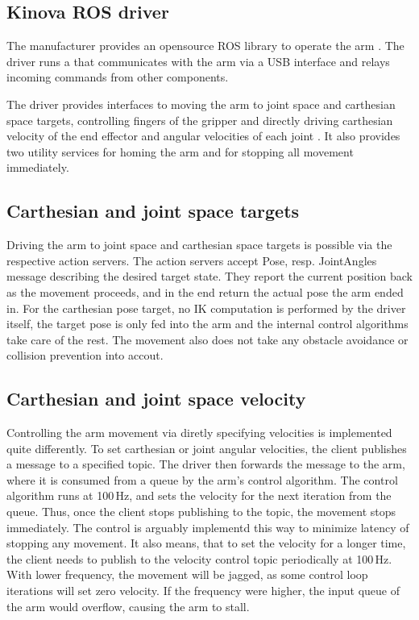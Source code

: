 \documentclass[buriama8_dp.tex]{subfiles}
\begin{document}
\subsection{Kinova ROS driver}
\label{subsec:kinova_ros}

The manufacturer provides an opensource ROS library to operate the arm \cite{kinova_ros}. The driver runs a  that communicates with the arm via a USB interface and relays incoming commands from other components.

The driver provides interfaces to moving the arm to joint space and carthesian space targets, controlling fingers of the gripper and directly driving carthesian velocity of the end effector and angular velocities of each joint \cite{kinova_ros_api}. It also provides two utility services for homing the arm and for stopping all movement immediately.

\subsection{Carthesian and joint space targets}
\label{subsec:api_cart_action}

Driving the arm to joint space and carthesian space targets is possible via the respective action servers. The action servers accept Pose, resp. JointAngles message describing the desired target state. They report the current position back as the movement proceeds, and in the end return the actual pose the arm ended in. For the carthesian pose target, no IK computation is performed by the driver itself, the target pose is only fed into the arm and the internal control algorithms take care of the rest. The movement also does not take any obstacle avoidance or collision prevention into accout. 

\subsection{Carthesian and joint space velocity}
\label{subsec:api_cart_vel}

Controlling the arm movement via diretly specifying velocities is implemented quite differently. To set carthesian or joint angular velocities, the client publishes a message to a specified topic. The driver then forwards the message to the arm, where it is consumed from a queue by the arm's control algorithm. The control algorithm runs at 100\,Hz, and sets the velocity for the next iteration from the queue. Thus, once the client stops publishing to the topic, the movement stops immediately. The control is arguably implementd this way to minimize latency of stopping any movement. It also means, that to set the velocity for a longer time, the client needs to publish to the velocity control topic periodically at 100\,Hz. With lower frequency, the movement will be jagged, as some control loop iterations will set zero velocity. If the frequency were higher, the input queue of the arm would overflow, causing the arm to stall.
\end{document}
